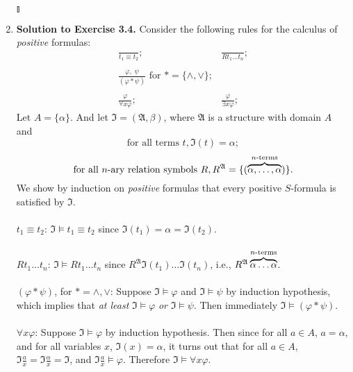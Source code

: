 \begin{enumerate}[1.]
\begin{tabular}{lll}
\end{tabular}
\\\begin{flushright}$\talloblong$\end{flushright}
%
\item \textbf{Solution to Exercise 3.4.} Consider the following rules for the calculus of \textit{positive} formulas:
\[
\begin{array}{ll}
\displaystyle \frac{\ }{t_1 \equiv t_2}; & \displaystyle \frac{\ }{Rt_1 \ldots t_n}; \\
\  & \  \\
\displaystyle \frac{ \displaystyle {\varphi, \; \psi} }{(\varphi \ast \psi)} \mbox{ for } \ast = \{ \land, \lor \}; & \  \\
\  & \  \\
\displaystyle \frac{\varphi}{\forall x \varphi}; & \displaystyle \frac{\varphi}{\exists x \varphi};
\end{array}
\]
Let $A = \{ \alpha \}$. And let $\mathfrak{I} = (\mathfrak{A}, \beta)$, where $\mathfrak{A}$ is a structure with domain $A$ and 
\[
\mbox{for all terms } t, \mathfrak{I}(t) = \alpha ; 
\]
\[
\mbox{for all $n$-ary relation symbols } R, R^\mathfrak{A} = \{ (\overbrace{\alpha, \ldots, \alpha}^{\mbox{\scriptsize $n$-terms}}) \}.
\]
We show by induction on \textit{positive} formulas that every positive $S$-formula is satisfied by $\mathfrak{I}$.\\
\\$t_1 \equiv t_2$: $\mathfrak{I} \models t_1 \equiv t_2$ since $\mathfrak{I}(t_1) = \alpha = \mathfrak{I}(t_2)$.\\
\\$Rt_1 \ldots t_n$: $\mathfrak{I} \models Rt_1 \ldots t_n$ since $R^\mathfrak{A} \mathfrak{I}(t_1) \ldots \mathfrak{I}(t_n)$, i.e., $R^\mathfrak{A} \overbrace{\alpha \ldots \alpha}^{\mbox{\scriptsize $n$-terms}}$.\\
\\$(\varphi \ast \psi)$, for $\ast = \land, \lor$: Suppose $\mathfrak{I} \models \varphi$ and $\mathfrak{I} \models \psi$ by induction hypothesis, which implies that \textit{at least} $\mathfrak{I} \models \varphi$ \textit{or} $\mathfrak{I} \models \psi$. Then immediately $\mathfrak{I} \models (\varphi \ast \psi)$.\\
\\$\forall x \varphi$: Suppose $\mathfrak{I} \models \varphi$ by induction hypothesis. Then since for all $a \in A$, $a = \alpha$, and for all variables $x$, $\mathfrak{I}(x) = \alpha$, it turns out that for all $a \in A$, $\mathfrak{I} \frac{a}{x} = \mathfrak{I} \frac{\alpha}{x} = \mathfrak{I}$, and $\mathfrak{I} \frac{a}{x} \models \varphi$. Therefore $\mathfrak{I} \models \forall x \varphi$.\\

\end{enumerate}
